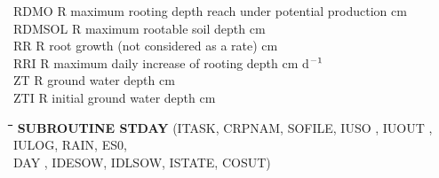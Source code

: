 \begin{tabbing}
RDMO\> \> R\> maximum rooting depth reach under potential production\> \> \> \> \> \> \> cm\\
RDMSOL\> \> R\> maximum rootable soil depth\> \> \> \> \> \> \> cm\\
RR\> \> R\> root growth (not considered as a rate)\> \> \> \> \> \> \> cm \\
RRI\> \> R\> maximum daily increase of rooting depth\> \> \> \> \> \> \> cm d$^{{\rm -1}}$\\
ZT\> \> R\> ground water depth\> \> \> \> \> \> \> cm\\
ZTI\> \> R\> initial ground water depth\> \> \> \> \> \> \> cm
\end{tabbing}

\bigskip
\bigskip
\bigskip
\nwln
\begin{tabbing}
\hspace{1.27cm}\=\hspace{1.27cm}\=\hspace{1.27cm}\=\hspace{1.27cm}\=%
\hspace{1.27cm}\=\hspace{1.27cm}\=\hspace{1.27cm}\=\hspace{1.27cm}\=%
\hspace{1.27cm}\=\hspace{1.27cm}\=\kill
{\bf SUBROUTINE STDAY}\> \> \> (ITASK, CRPNAM, SOFILE, IUSO  , IUOUT , IULOG, RAIN, ES0,\\
\>\> \>  DAY , IDESOW, IDLSOW, ISTATE, COSUT)
\end{tabbing}
\nwln

